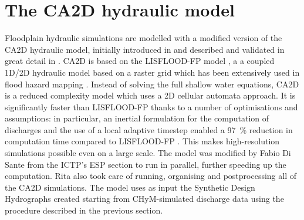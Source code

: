 \section{The CA2D hydraulic model}\label{sec:ca2d}
Floodplain hydraulic simulations are modelled with a modified version of the CA2D hydraulic model, initially introduced in \citet{Dottori2010} and described and validated in great detail in \citet{Dottori2011}.
CA2D is based on the LISFLOOD-FP model \citep{Bates2005}, a a coupled 1D/2D hydraulic model based on a raster grid which has been extensively used in flood hazard mapping \citep[see e.g.][]{ThomasStevenSavage2016, Neal2011, Skinner2015}. Instead of solving the full shallow water equations, CA2D is a reduced complexity model which uses a 2D cellular automata approach.
It is significantly faster than LISFLOOD-FP thanks to a number of optimisations and assumptions: in particular, an inertial formulation \citep{Bates2010}
for the computation of discharges and the use of a local adaptive timestep \citep{Zhang1994} enabled a \SI{97}{\%} reduction in computation time compared to LISFLOOD-FP \citep{Dottori2011}.
This makes high-resolution simulations possible even on a large scale.
The model was modified by Fabio Di Sante from the ICTP's ESP section to run in parallel, further speeding up the computation. Rita also took care of running, organising and postprocessing all of the CA2D simulations.
The model uses as input the Synthetic Design Hydrographs created starting from CHyM-simulated discharge data using the procedure described in the previous section.

